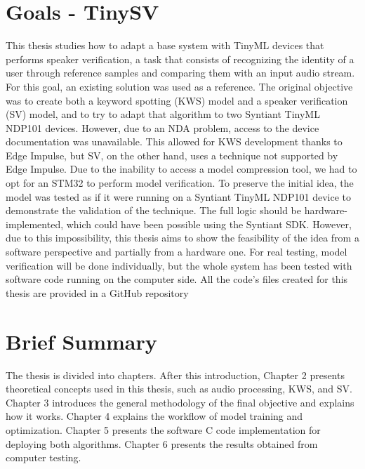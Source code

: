 \section{Goals - TinySV}
\label{sec:tinysv}
This thesis studies how to adapt a base system with TinyML devices that performs speaker verification, a task that consists of recognizing the identity of a user through reference samples and comparing them with an input audio stream.  
For this goal, an existing solution was used as a reference\cite{dvector_extractor_TinySV}. The original objective was to create both a keyword spotting (KWS) model and a speaker verification (SV) model, and to try to adapt that algorithm to two Syntiant TinyML NDP101 devices. However, due to an NDA problem, access to the device documentation was unavailable. This allowed for KWS development thanks to Edge Impulse\cite{edgeimpulse_syntiant_tinyml}, but SV, on the other hand, uses a technique not supported by Edge Impulse. Due to the inability to access a model compression tool, we had to opt for an STM32 to perform model verification.  
To preserve the initial idea, the model was tested as if it were running on a Syntiant TinyML NDP101 device to demonstrate the validation of the technique. The full logic should be hardware-implemented, which could have been possible using the Syntiant SDK. However, due to this impossibility, this thesis aims to show the feasibility of the idea from a software perspective and partially from a hardware one.  
For real testing, model verification will be done individually, but the whole system has been tested with software code running on the computer side.  
All the code's files created for this thesis are provided in a GitHub repository\footnotemark{}

\section{Brief Summary}
The thesis is divided into chapters. After this introduction, Chapter 2 presents theoretical concepts used in this thesis, such as audio processing, KWS, and SV. Chapter 3 introduces the general methodology of the final objective and explains how it works. Chapter 4 explains the workflow of model training and optimization. Chapter 5 presents the software C code implementation for deploying both algorithms. Chapter 6 presents the results obtained from computer testing.
\newpage
